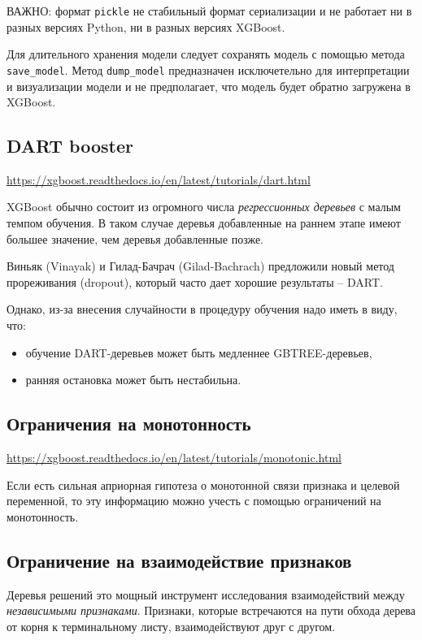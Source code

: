 \documentclass[%
	11pt,
	a4paper,
	utf8,
		]{article}
\begin{document}
ВАЖНО: формат \verb|pickle| не стабильный формат сериализации и не работает ни в разных версиях Python, ни в разных версиях XGBoost.

Для длительного хранения модели следует сохранять модель с помощью метода \verb|save_model|. Метод \verb|dump_model| предназначен исключетельно для интерпретации и визуализации модели и не предполагает, что модель будет обратно загружена в XGBoost.

\subsection{DART booster}

\url{https://xgboost.readthedocs.io/en/latest/tutorials/dart.html}

XGBoost обычно состоит из огромного числа \emph{регрессионных деревьев} с малым темпом обучения. В таком случае деревья добавленные на раннем этапе имеют большее значение, чем деревья добавленные позже.

 Виньяк (Vinayak) и Гилад-Бачрач (Gilad-Bachrach) \cite{dart:2015} предложили новый метод прореживания (dropout), который часто дает хорошие результаты -- DART.
 
 Однако, из-за внесения случайности в процедуру обучения надо иметь в виду, что:
 \begin{itemize}
 	\item  обучение DART-деревьев может быть медленнее GBTREE-деревьев,
 	
 	\item ранняя остановка может быть нестабильна.
 \end{itemize}

\subsection{Ограничения на монотонность}

\url{https://xgboost.readthedocs.io/en/latest/tutorials/monotonic.html}

Если есть сильная априорная гипотеза о монотонной связи признака и целевой переменной, то эту информацию можно учесть с помощью ограничений на монотонность.

\subsection{Ограничение на взаимодействие признаков}

Деревья решений это мощный инструмент исследования взаимодействий между \emph{независимыми признаками}. Признаки, которые встречаются на пути обхода дерева от корня к терминальному листу, взаимодействуют друг с другом.
\end{document}
